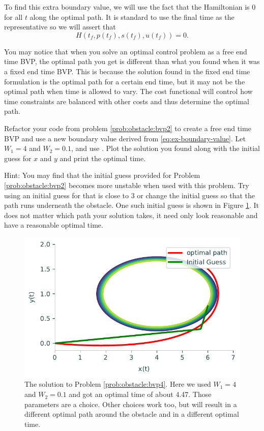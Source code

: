To find this extra boundary value, we will use the fact that the Hamiltonian is 0 for all $t$ along the optimal path. It is standard to use the final time as the representative so we will assert that
\begin{equation}\label{eq:ex-boundary-value}
    H(t_f,p(t_f),s(t_f),u(t_f)) = 0.
\end{equation}

You may notice that when you solve an optimal control problem as a free end time BVP, the optimal path you get is different than what you found when it was a fixed end time BVP. 
This is because the solution found in the fixed end time formulation is the optimal path for a certain end time, but it may not be the optimal path when time is allowed to vary.
The cost functional will control how time constraints are balanced with other costs and thus determine the optimal path.

\begin{problem}
\label{prob:obstacle:bvp4}
Refactor your code from problem \ref{prob:obstacle:bvp2} to create a free end time BVP and use a new boundary value derived from \ref{eq:ex-boundary-value}. 
Let $W_1 = 4$ and $W_2 = 0.1$, and use . 
Plot the solution you found along with the initial guess for $x$ and $y$ and print the optimal time.

Hint: You may find that the initial guess provided for Problem \ref{prob:obstacle:bvp2} becomes more unstable when used with this problem. 
Try using an initial guess for  that is close to $3$ or change the initial guess  so that the path runs underneath the obstacle. 
One such initial guess is shown in Figure \ref{fig:OA_prob4}. It does not matter which path your solution takes, it need only look reasonable and have a reasonable optimal time.
\end{problem}

\begin{figure}[H]
    \centering
    \includegraphics[width=5.75in]{figures/OA_prob4.pdf}
    \caption{The solution to Problem \ref{prob:obstacle:bvp4}.  Here we used $W_1 = 4$ and $W_2 = 0.1$ and got an optimal time of about 4.47.  Those parameters are a choice.  Other choices work too, but will result in a different optimal path around the obstacle and in a different optimal time.}
    \label{fig:OA_prob4}
\end{figure}
